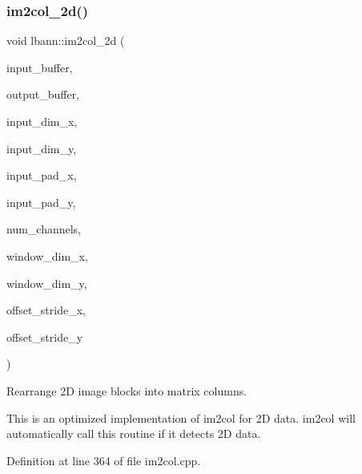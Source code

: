 \subsubsection{\texorpdfstring{im2col\+\_\+2d()}{im2col\_2d()}}
{\footnotesize\ttfamily void lbann\+::im2col\+\_\+2d (\begin{DoxyParamCaption}\item[{const Data\+Type $\ast$\+\_\+\+\_\+restrict\+\_\+\+\_\+}]{input\+\_\+buffer,  }\item[{Data\+Type $\ast$\+\_\+\+\_\+restrict\+\_\+\+\_\+}]{output\+\_\+buffer,  }\item[{int}]{input\+\_\+dim\+\_\+x,  }\item[{int}]{input\+\_\+dim\+\_\+y,  }\item[{int}]{input\+\_\+pad\+\_\+x,  }\item[{int}]{input\+\_\+pad\+\_\+y,  }\item[{int}]{num\+\_\+channels,  }\item[{int}]{window\+\_\+dim\+\_\+x,  }\item[{int}]{window\+\_\+dim\+\_\+y,  }\item[{int}]{offset\+\_\+stride\+\_\+x,  }\item[{int}]{offset\+\_\+stride\+\_\+y }\end{DoxyParamCaption})}



Rearrange 2D image blocks into matrix columns. 

This is an optimized implementation of im2col for 2D data. im2col will automatically call this routine if it detects 2D data. 

Definition at line 364 of file im2col.\+cpp.


